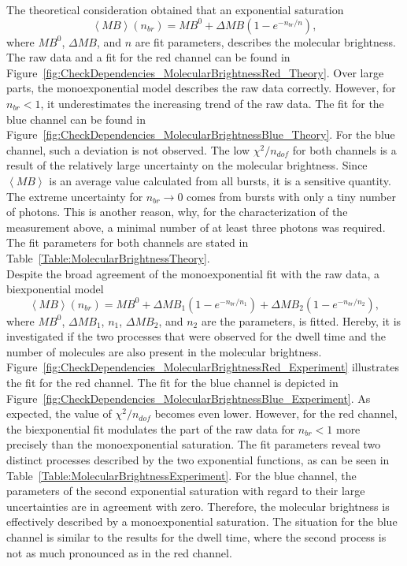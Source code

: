 The theoretical consideration obtained that an exponential saturation 
\begin{equation}
	\left\langle MB \right\rangle (n_{br})   = MB^0 + \Delta MB(1 - e^{-n_{br}/ n}),
\end{equation}
where $MB^0$, $\Delta MB$, and $n$ are fit parameters, describes the molecular brightness. The raw data and a fit for the red channel can be found in Figure~\ref{fig:CheckDependencies_MolecularBrightnessRed_Theory}. Over large parts, the monoexponential model describes the raw data correctly. However, for $n_{br} < 1$, it underestimates the increasing trend of the raw data. The fit for the blue channel can be found in Figure~\ref{fig:CheckDependencies_MolecularBrightnessBlue_Theory}. For the blue channel, such a deviation is not observed. The low $\chi^2/ n_{dof}$ for both channels is a result of the relatively large uncertainty on the molecular brightness. Since $\left\langle MB \right\rangle$ is an average value calculated from all bursts, it is a sensitive quantity. The extreme uncertainty for $n_{br} \rightarrow 0$ comes from bursts with only a tiny number of photons. This is another reason, why, for the characterization of the measurement above, a minimal number of at least three photons was required. The fit parameters for both channels are stated in Table~\ref{Table:MolecularBrightnessTheory}.\\

Despite the broad agreement of the monoexponential fit with the raw data, a biexponential model
\begin{equation}
\left\langle MB \right\rangle (n_{br}) = MB^0 + \Delta MB_1(1 - e^{-n_{br}/ n_1}) + \Delta MB_2(1 - e^{-n_{br}/ n_2}),
\end{equation}
where $MB^0$, $\Delta MB_1$, $n_1$, $\Delta MB_2$, and $n_2$ are the parameters, is fitted. Hereby, it is investigated if the two processes that were observed for the dwell time and the number of molecules are also present in the molecular brightness. Figure~\ref{fig:CheckDependencies_MolecularBrightnessRed_Experiment} illustrates the fit for the red channel. The fit for the blue channel is depicted in Figure~\ref{fig:CheckDependencies_MolecularBrightnessBlue_Experiment}. As expected, the value of $\chi^2/ n_{dof}$ becomes even lower. However, for the red channel, the biexponential fit modulates the part of the raw data for $n_{br} < 1$ more precisely than the monoexponential saturation. The fit parameters reveal two distinct processes described by the two exponential functions, as can be seen in Table~\ref{Table:MolecularBrightnessExperiment}. For the blue channel, the parameters of the second exponential saturation with regard to their large uncertainties are in agreement with zero. Therefore, the molecular brightness is effectively described by a monoexponential saturation. The situation for the blue channel is similar to the results for the dwell time, where the second process is not as much pronounced as in the red channel.


